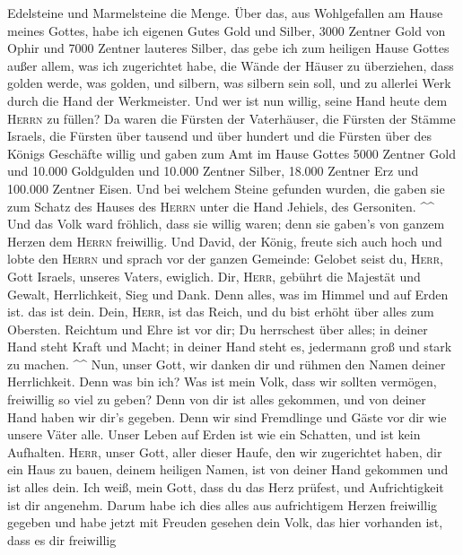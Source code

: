 Edelsteine und Marmelsteine die Menge.  Über das, aus
Wohlgefallen am Hause meines Gottes, habe ich eigenen Gutes Gold und
Silber,  3000 Zentner Gold von Ophir und 7000 Zentner
lauteres Silber, das gebe ich zum heiligen Hause Gottes außer allem, was
ich zugerichtet habe, die Wände der Häuser zu überziehen, 
dass golden werde, was golden, und silbern, was silbern sein soll, und
zu allerlei Werk durch die Hand der Werkmeister. Und wer ist nun willig,
seine Hand heute dem \textsc{Herrn} zu füllen?  Da waren
die Fürsten der Vaterhäuser, die Fürsten der Stämme Israels, die Fürsten
über tausend und über hundert und die Fürsten über des Königs Geschäfte
willig  und gaben zum Amt im Hause Gottes 5000 Zentner
Gold und 10.000 Goldgulden und 10.000 Zentner Silber, 18.000 Zentner Erz
und 100.000 Zentner Eisen.  Und bei welchem Steine
gefunden wurden, die gaben sie zum Schatz des Hauses des \textsc{Herrn}
unter die Hand Jehiels, des Gersoniten. \^{}\^{}  Und das
Volk ward fröhlich, dass sie willig waren; denn sie gaben's von ganzem
Herzen dem \textsc{Herrn} freiwillig. Und David, der König, freute sich
auch hoch  und lobte den \textsc{Herrn} und sprach vor
der ganzen Gemeinde: Gelobet seist du, \textsc{Herr}, Gott Israels,
unseres Vaters, ewiglich.  Dir, \textsc{Herr}, gebührt
die Majestät und Gewalt, Herrlichkeit, Sieg und Dank. Denn alles, was im
Himmel und auf Erden ist. das ist dein. Dein, \textsc{Herr}, ist das
Reich, und du bist erhöht über alles zum Obersten. 
Reichtum und Ehre ist vor dir; Du herrschest über alles; in deiner Hand
steht Kraft und Macht; in deiner Hand steht es, jedermann groß und stark
zu machen. \^{}\^{}  Nun, unser Gott, wir danken dir und
rühmen den Namen deiner Herrlichkeit.  Denn was bin ich?
Was ist mein Volk, dass wir sollten vermögen, freiwillig so viel zu
geben? Denn von dir ist alles gekommen, und von deiner Hand haben wir
dir's gegeben.  Denn wir sind Fremdlinge und Gäste vor
dir wie unsere Väter alle. Unser Leben auf Erden ist wie ein Schatten,
und ist kein Aufhalten.  \textsc{Herr}, unser Gott, aller
dieser Haufe, den wir zugerichtet haben, dir ein Haus zu bauen, deinem
heiligen Namen, ist von deiner Hand gekommen und ist alles dein.
 Ich weiß, mein Gott, dass du das Herz prüfest, und
Aufrichtigkeit ist dir angenehm. Darum habe ich dies alles aus
aufrichtigem Herzen freiwillig gegeben und habe jetzt mit Freuden
gesehen dein Volk, das hier vorhanden ist, dass es dir freiwillig
